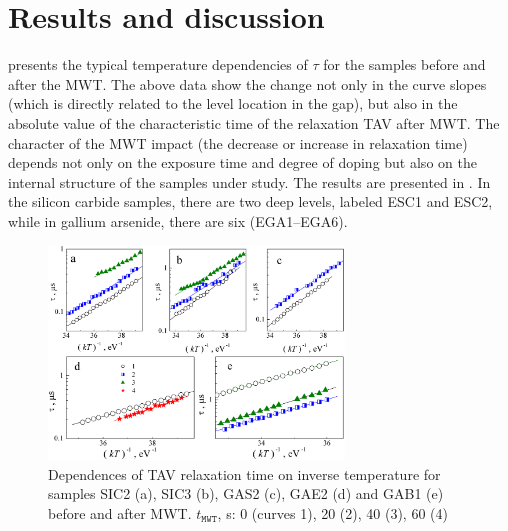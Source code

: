 \documentclass[10pt]{iopart}
\begin{document}
\section{Results and discussion}\label{sec:Rez}

 presents the typical temperature dependencies of $\tau$ for the samples before and after the MWT.
The above data show the change not only in the curve slopes (which is directly related to the level location in the gap),
but also in the absolute value of the characteristic time of the relaxation TAV after MWT.
The character of the MWT impact (the decrease or increase in relaxation time) depends not only on the exposure time and degree of doping but also on the internal structure of the samples under study.
The results are presented in .
In the silicon carbide samples, there are two deep levels, labeled ESC1 and ESC2, while in gallium arsenide, there are six (EGA1–EGA6).


\begin{figure}
\center
\includegraphics[width=0.7\textwidth]{Fig3}
\caption{\label{figTauTAV}
Dependences of TAV relaxation time on inverse temperature for samples SIC2 (a), SIC3 (b), GAS2 (c), GAE2 (d) and GAB1 (e) before and after MWT.
$t_\mathtt{MWT}$, s: 0 (curves 1), 20 (2), 40 (3), 60 (4)
}%
\end{figure}
\end{document}
